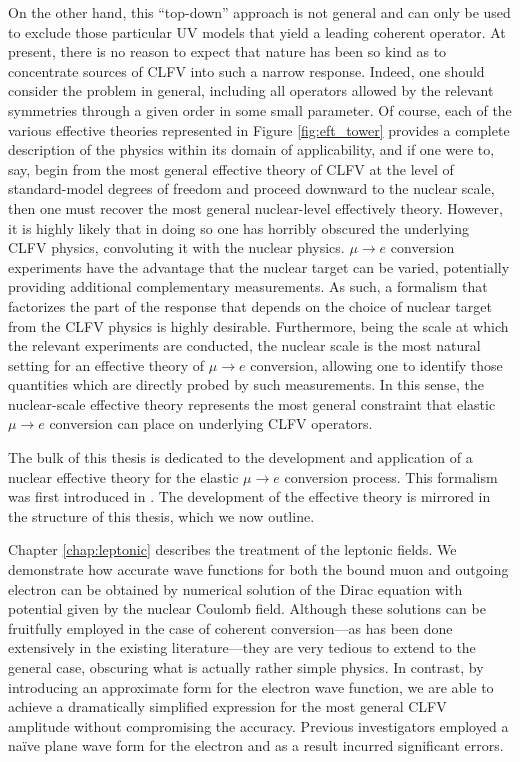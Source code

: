 \documentclass{book}[letterpaper,12pt]
\begin{document}
On the other hand, this ``top-down'' approach is not general and can only be used to exclude those particular UV models that yield a leading coherent operator. At present, there is no reason to expect that nature has been so kind as to concentrate sources of CLFV into such a narrow response. Indeed, one should consider the problem in general, including all operators allowed by the relevant symmetries through a given order in some small parameter. Of course, each of the various effective theories represented in Figure \ref{fig:eft_tower} provides a complete description of the physics within its domain of applicability, and if one were to, say, begin from the most general effective theory of CLFV at the level of standard-model degrees of freedom and proceed downward to the nuclear scale, then one must recover the most general nuclear-level effectively theory. However, it is highly likely that in doing so one has horribly obscured the underlying CLFV physics, convoluting it with the nuclear physics. $\mu\rightarrow e$ conversion experiments have the advantage that the nuclear target can be varied, potentially providing additional complementary measurements. As such, a formalism that factorizes the part of the response that depends on the choice of nuclear target from the CLFV physics is highly desirable. Furthermore, being the scale at which the relevant experiments are conducted, the nuclear scale is the most natural setting for an effective theory of $\mu\rightarrow e$ conversion, allowing one to identify those quantities which are directly probed by such measurements. In this sense, the nuclear-scale effective theory represents the most general constraint that elastic $\mu\rightarrow e$ conversion can place on underlying CLFV operators.

The bulk of this thesis is dedicated to the development and application of a nuclear effective theory for the elastic $\mu\rightarrow e$ conversion process. This formalism was first introduced in \cite{rule2021nucleonlevel,haxton_2022}. The development of the effective theory is mirrored in the structure of this thesis, which we now outline.

Chapter \ref{chap:leptonic} describes the treatment of the leptonic fields. We demonstrate how accurate wave functions for both the bound muon and outgoing electron can be obtained by numerical solution of the Dirac equation with potential given by the nuclear Coulomb field. Although these solutions can be fruitfully employed in the case of coherent conversion---as has been done extensively in the existing literature---they are very tedious to extend to the general case, obscuring what is actually rather simple physics. In contrast, by introducing an approximate form for the electron wave function, we are able to achieve a dramatically simplified expression for the most general CLFV amplitude without compromising the accuracy. Previous investigators employed a na\"ive plane wave form for the electron and as a result incurred significant errors.
\end{document}
